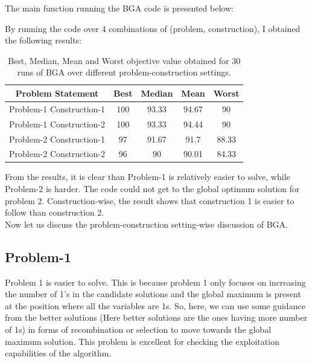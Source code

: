 \documentclass{article}
\begin{document}
	 \vspace{5mm}
	 
	The main function running the BGA code is presented below:
	
	
	\vspace{2mm}
	By running the code over 4 combinations of (problem, construction), I obtained the following results:\\
	
	\begin{table}[H]
		\centering
		\caption{Best, Median, Mean and Worst objective value obtained for 30 runs of BGA over different problem-construction settings.}
		\begin{tabular}{|c|c|c|c|c|}
			\hline
			\textbf{Problem Statement} & \textbf{Best}  & \textbf{Median} & \textbf{Mean} & \textbf{Worst} \\ \hline
			Problem-1 Construction-1 & 100 & 93.33 & 94.67 & 90 \\ \hline
			Problem-1 Construction-2 & 100 & 93.33 & 94.44 & 90 \\ \hline
			Problem-2 Construction-1 & 97 & 91.67 & 91.7 & 88.33 \\ \hline
			Problem-2 Construction-2 & 96 & 90 & 90.01 & 84.33 \\ \hline
		\end{tabular}
	\end{table}
	
	From the results, it is clear than Problem-1 is relatively easier to solve, while Problem-2 is harder. The code could not get to the global optimum solution for problem 2. Construction-wise, the result shows that construction 1 is easier to follow than construction 2.\\
	
	Now let us discuss the problem-construction setting-wise discussion of BGA.\\
	
	\subsection{Problem-1}
	Problem 1 is easier to solve. This is because problem 1 only focuses on increasing the number of 1's in the candidate solutions and the global maximum is present at the position where all the variables are 1s. So, here, we can use some guidance from the better solutions (Here better solutions are the ones having more number of 1s) in forms of recombination or selection to move towards the global maximum solution. This problem is excellent for checking the exploitation capabilities of the algorithm.
	
\end{document}
